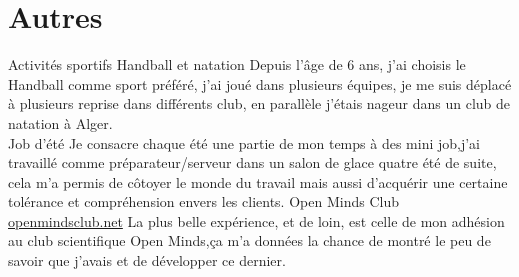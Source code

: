\documentclass[]{friggeri-cv}
\begin{document}
\section{Autres}
\begin{entrylist}
  \entry
    { }
    {Activités sportifs}
    {Handball et natation}
    {Depuis l'âge de 6 ans, j'ai choisis le Handball comme sport préféré, j'ai joué dans plusieurs équipes, je me suis déplacé à plusieurs reprise dans différents club, en parallèle j'étais nageur dans un club de natation à Alger.\\}
  \entry
    {}
    {Job d'été}
    {}
    {Je consacre chaque été une partie de mon temps à des mini job,j'ai travaillé comme préparateur/serveur dans un salon de glace quatre été de suite, cela m'a permis de côtoyer le monde du travail mais aussi d’acquérir une certaine tolérance et compréhension envers les clients.}
  \entry
    { }
    {Open Minds Club}
    {\href{http://www.openmindsclub.net}{openmindsclub.net}}
    {La plus belle expérience, et de loin, est celle de mon adhésion au club scientifique Open Minds,ça m'a données la chance de montré le peu de savoir que j'avais et de développer ce dernier.\\}
\end{entrylist}
\end{document}

